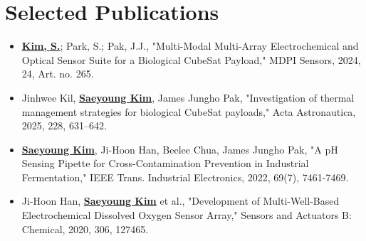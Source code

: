 \documentclass[letterpaper,11pt]{moderncv}
\begin{document}
\section{Selected Publications}
\begin{sloppypar}
\begin{itemize}[leftmargin=1cm, itemsep=0pt, parsep=0pt]
    \item \textbf{\underline{Kim, S.}}; Park, S.; Pak, J.J., "Multi-Modal Multi-Array Electrochemical and Optical Sensor Suite for a Biological CubeSat Payload," MDPI Sensors, 2024, 24, Art. no. 265.
    \item Jinhwee Kil, \textbf{\underline{Saeyoung Kim}}, James Jungho Pak, "Investigation of thermal management strategies for biological CubeSat payloads," Acta Astronautica, 2025, 228, 631--642.
    \item \textbf{\underline{Saeyoung Kim}}, Ji-Hoon Han, Beelee Chua, James Jungho Pak, "A pH Sensing Pipette for Cross-Contamination Prevention in Industrial Fermentation," IEEE Trans. Industrial Electronics, 2022, 69(7), 7461-7469.
    \item Ji-Hoon Han, \textbf{\underline{Saeyoung Kim}} et al., "Development of Multi-Well-Based Electrochemical Dissolved Oxygen Sensor Array," Sensors and Actuators B: Chemical, 2020, 306, 127465.
\end{itemize}
\end{sloppypar}

\vfill
{}
\end{document}
